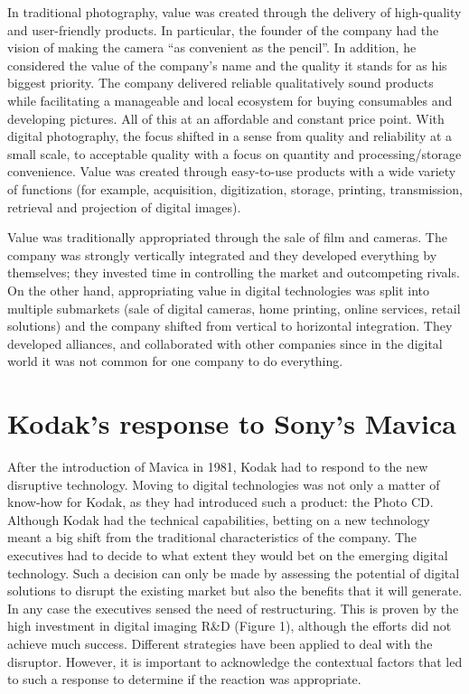 \documentclass[a4paper,10pt,UTF8]{scrartcl}
\begin{document}
In traditional photography, value was created through the delivery of high-quality and 
user-friendly products. In particular, the founder of the company had the vision of 
making the camera “as convenient as the pencil”. In addition, he considered the value 
of the company's name and the quality it stands for as his biggest priority. 
The company delivered reliable qualitatively sound products while facilitating 
a manageable and local ecosystem for buying consumables and developing pictures. 
All of this at an affordable and constant price point. With digital photography, 
the focus shifted in a sense from quality and reliability at a small scale, 
to acceptable quality with a focus on quantity and processing/storage convenience. 
Value was created through easy-to-use products with a wide variety of functions 
(for example, acquisition, digitization, storage, printing, transmission, 
retrieval and projection of digital images).

Value was traditionally appropriated through the sale of film and cameras. 
The company was strongly vertically integrated and they developed everything by 
themselves; they invested time in controlling the market and outcompeting rivals.
 On the other hand, appropriating value in digital technologies was split into multiple 
 submarkets (sale of digital cameras, home printing, online services, retail solutions) 
 and the company shifted from vertical to horizontal integration. They developed 
 alliances, and collaborated with other companies since in the digital world it was 
 not common for one company to do everything.



\section{Kodak's response to Sony's Mavica}

After the introduction of Mavica in 1981, Kodak had to respond to the new disruptive 
technology. Moving to digital technologies was not only a matter of know-how for 
Kodak, as they had introduced such a product: the  Photo CD. Although Kodak had 
the technical capabilities, betting on a new technology meant a big shift from the 
traditional characteristics of the company. The executives had to decide to what 
extent they would bet on the emerging digital technology. Such a decision can only 
be made by assessing the potential of digital solutions to disrupt the existing 
market but also the benefits that it will generate. In any case the executives 
sensed the need of restructuring. This is proven by the high investment in digital 
imaging R\&D (Figure 1), although the efforts did not achieve much success. 
Different strategies have been applied to deal with the disruptor. 
However, it is important to acknowledge the contextual factors that led to 
such a response to determine if the reaction was appropriate.
\end{document}
